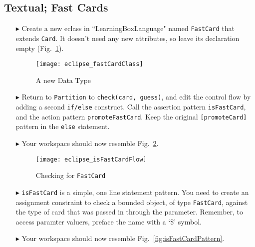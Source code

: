 \newpage
\subsection{Textual; Fast Cards}
\texHeader
\hypertarget{fastCard tex}{}

\begin{itemize}
  
\item[$\blacktriangleright$] Create a new eclass in ``LearningBoxLanguage" named \texttt{FastCard} that extends \texttt{Card}. It doesn't need any new
attributes, so leave its declaration empty (Fig.~\ref{fig:fastClass}).

\begin{figure}[htp]
\begin{center}
  \texttt{[image: eclipse\_fastCardClass]}
  \caption{A new Data Type}
  \label{fig:fastClass}
\end{center}
\end{figure}

\item[$\blacktriangleright$] Return to \texttt{Partition} to \texttt{check(card, guess)}, and edit the control flow by adding a second \texttt{if/else}
construct. Call the assertion pattern \texttt{isFastCard}, and the action pattern \texttt{promoteFastCard}. Keep the original \texttt{[promoteCard]} pattern in
the \texttt{else} statement.

\item[$\blacktriangleright$] Your workspace should now resemble Fig.~\ref{fig:isFastCard}.

\begin{figure}[htp]
\begin{center}
  \texttt{[image: eclipse\_isFastCardFlow]}
  \caption{Checking for \texttt{FastCard}}
  \label{fig:isFastCard}
\end{center}
\end{figure}

\item[$\blacktriangleright$] \texttt{isFastCard} is a simple, one line statement pattern. You need to create an assignment constraint to check a bounded object,
of type \texttt{FastCard}, against the type of card that was passed in through the parameter. Remember, to access paramter valuers, preface the name with a `\$'
symbol.

\item[$\blacktriangleright$] Your workspace should now resemble Fig.~\ref{fig:isFastCardPattern}.


\end{itemize}
